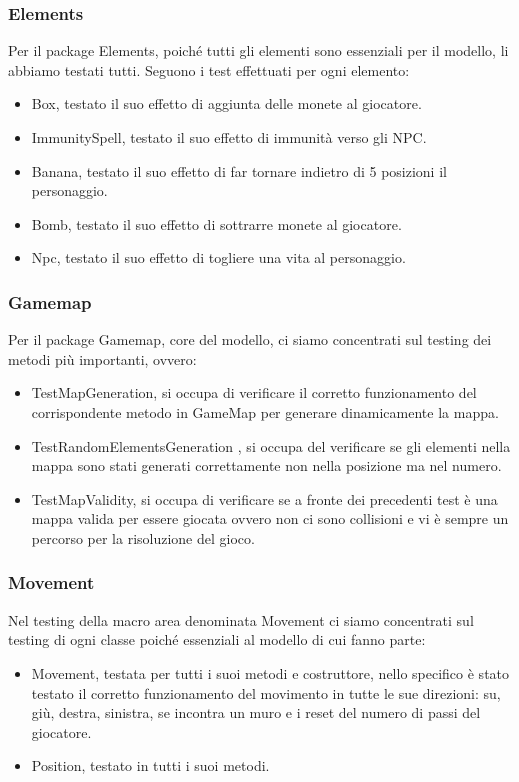 \documentclass[12pt, letterpaper]{article}
\begin{document}
        \subsubsection{Elements}
            Per il package Elements, poiché tutti gli elementi sono essenziali per il modello, li abbiamo testati tutti.
            Seguono i test effettuati per ogni elemento:
                \begin{itemize}
                    \item Box, testato il suo effetto di aggiunta delle monete al giocatore.
                    \item ImmunitySpell, testato il suo effetto di immunità verso gli NPC.
                    \item Banana, testato il suo effetto di far tornare indietro di 5 posizioni il personaggio.
                    \item Bomb, testato il suo effetto di sottrarre monete al giocatore.
                    \item Npc, testato il suo effetto di togliere una vita al personaggio.
                \end{itemize}
        \subsubsection{Gamemap}
            Per il package Gamemap, core del modello, ci siamo concentrati sul testing dei metodi più importanti, ovvero:
                \begin{itemize}
                    \item TestMapGeneration, si occupa di verificare il corretto funzionamento del corrispondente metodo in GameMap per generare dinamicamente la mappa.
                    \item TestRandomElementsGeneration , si occupa del verificare se gli elementi nella mappa sono stati generati correttamente non nella posizione ma nel numero.
                    \item TestMapValidity, si occupa di verificare se a fronte dei precedenti test è una mappa valida per essere giocata ovvero non ci sono collisioni e vi è sempre un percorso per la risoluzione del gioco.
                \end{itemize}
        \subsubsection{Movement}
            Nel testing della macro area denominata Movement ci siamo concentrati sul testing di ogni classe poiché essenziali al modello di cui fanno parte:
                \begin{itemize}
                    \item Movement, testata per tutti i suoi metodi e costruttore, nello specifico è stato testato il corretto funzionamento del movimento in tutte le sue direzioni: su, giù, destra, sinistra, se incontra un muro e i reset del numero di passi del giocatore.
                    \item Position, testato in tutti i suoi metodi.
                \end{itemize}
\end{document}
